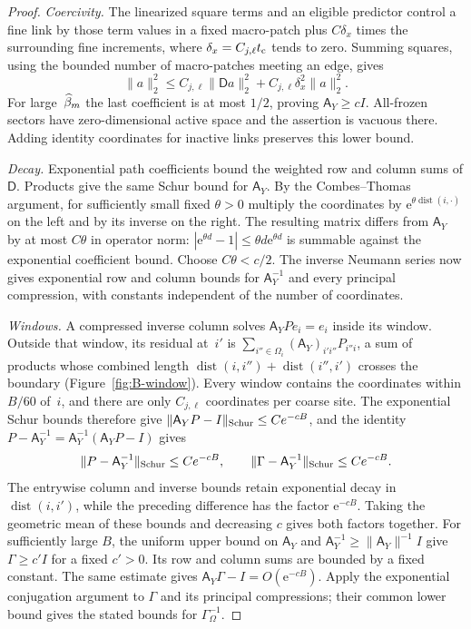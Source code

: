 \begin{proof}
\emph{Coercivity.} The linearized square terms and an eligible predictor control a fine link by those term values in a fixed macro-patch plus $C\delta_x$ times the surrounding fine increments, where $\delta_x=C_{j,\ell}t_{\rm c}$ tends to zero. Summing squares, using the bounded number of macro-patches meeting an edge, gives
\begin{equation*}
\|a\|_2^2\le C_{j,\ell}\|\mathsf Da\|_2^2+C_{j,\ell}\delta_x^2\|a\|_2^2.
\end{equation*}
For large~$\widehat{\beta}_m$ the last coefficient is at most $1/2$, proving $\mathsf A_Y\ge cI$. All-frozen sectors have zero-dimensional active space and the assertion is vacuous there. Adding identity coordinates for inactive links preserves this lower bound.

\emph{Decay.} Exponential path coefficients bound the weighted row and column sums of $\mathsf D$. Products give the same Schur bound for $\mathsf A_Y$. By the Combes--Thomas argument, for sufficiently small fixed $\theta>0$ multiply the coordinates by $\mathrm e^{\theta\operatorname{dist}(i,\cdot)}$ on the left and by its inverse on the right. The resulting matrix differs from $\mathsf A_Y$ by at most $C\theta$ in operator norm: $|\mathrm e^{\theta d}-1|\le\theta d \mathrm e^{\theta d}$ is summable against the exponential coefficient bound. Choose $C\theta<c/2$. The inverse Neumann series now gives exponential row and column bounds for $\mathsf A_Y^{-1}$ and every principal compression, with constants independent of the number of coordinates.

\emph{Windows.} A compressed inverse column solves $\mathsf A_YPe_i=e_i$ inside its window. Outside that window, its residual at~$i'$ is $\sum_{i''\in\Omega_i}(\mathsf A_Y)_{i'i''}P_{i''i}$, a sum of products whose combined length $\operatorname{dist}(i,i'')+\operatorname{dist}(i'',i')$ crosses the boundary (Figure~\ref{fig:B-window}). Every window contains the coordinates within $B/60$ of~$i$, and there are only $C_{j,\ell}$ coordinates per coarse site. The exponential Schur bounds therefore give $\|\mathsf A_YP-I\|_{\rm Schur}\le Ce^{-cB}$, and the identity $P-\mathsf A_Y^{-1}=\mathsf A_Y^{-1}(\mathsf A_YP-I)$ gives
\begin{equation*}
\|P-\mathsf A_Y^{-1}\|_{\rm Schur}\le Ce^{-cB},\qquad
\|\Gamma-\mathsf A_Y^{-1}\|_{\rm Schur}\le Ce^{-cB}.
\end{equation*}
The entrywise column and inverse bounds retain exponential decay in $\operatorname{dist}(i,i')$, while the preceding difference has the factor $\mathrm e^{-cB}$. Taking the geometric mean of these bounds and decreasing $c$ gives both factors together. For sufficiently large $B$, the uniform upper bound on $\mathsf A_Y$ and $\mathsf A_Y^{-1}\ge\|\mathsf A_Y\|^{-1}I$ give $\Gamma\ge c'I$ for a fixed $c'>0$. Its row and column sums are bounded by a fixed constant. The same estimate gives $\mathsf A_Y\Gamma-I=O(\mathrm e^{-cB})$. Apply the exponential conjugation argument to $\Gamma$ and its principal compressions; their common lower bound gives the stated bounds for $\Gamma_\Omega^{-1}$.


\end{proof}
